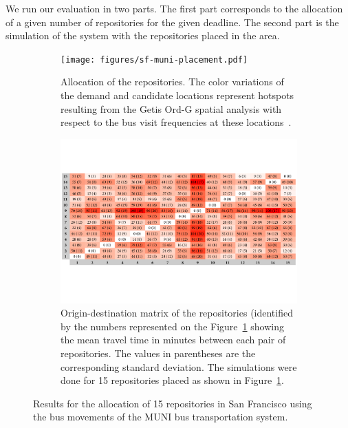 We run our evaluation in two parts. The first part corresponds to the allocation of a given number of repositories for the given deadline. The second part is the simulation of the system with the repositories placed in the area.

\begin{figure}[t]
    \begin{subfigure}[b]{0.44\textwidth}
        \centering
        \texttt{[image: figures/sf-muni-placement.pdf]}
        \caption{Allocation of the repositories. The color variations of the demand and candidate locations represent hotspots resulting from the Getis Ord-G spatial analysis with respect to the bus visit frequencies at these locations~\cite{getis1992analysis}.\vspace*{1.3em}}
        \label{fig:sf-muni-placement}
    \end{subfigure}
    \quad
    \begin{subfigure}[b]{0.54\textwidth}
        \centering
        \includegraphics[width=\linewidth]{figures/origin-destination-matrix-1.pdf}
        \caption{Origin-destination matrix of the repositories (identified by the numbers represented on the Figure~\ref{fig:sf-muni-placement} showing the mean travel time in minutes between each pair of repositories. The values in parentheses are the corresponding standard deviation. The simulations were done for 15 repositories placed as shown in Figure~\ref{fig:sf-muni-placement}.}
        \label{fig:propagation-times-matrix}
    \end{subfigure}
    \caption{Results for the allocation of 15 repositories in San Francisco using the bus movements of the MUNI bus transportation system.}
\end{figure}

